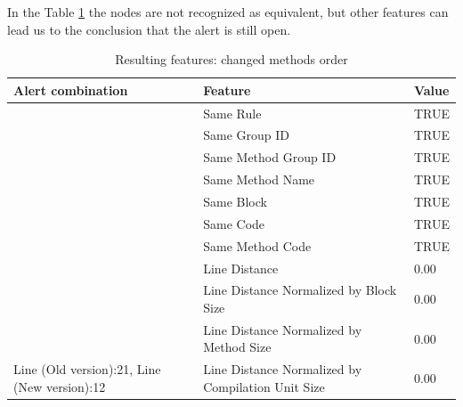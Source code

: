 \documentclass[
]{article}
\begin{document}
\newpage

In the Table \ref{changing_method_order} the nodes are not recognized as
equivalent, but other features can lead us to the conclusion that the
alert is still open.

\small

\begin{table}[!h]

\caption{\label{tab:unnamed-chunk-16}Resulting features: changed methods order \label{changing_method_order} }
\centering
\begin{tabular}[t]{l|l|l}
\hline
Alert combination & Feature & Value\\
\hline
\rowcolor{gray!6}   & Same Rule & TRUE\\

 & Same Group ID & TRUE\\

\rowcolor{gray!6}   & Same Method Group ID & TRUE\\

 & Same Method Name & TRUE\\

\rowcolor{gray!6}   & Same Block & TRUE\\

 & Same Code & TRUE\\

\rowcolor{gray!6}   & Same Method Code & TRUE\\

 & Line Distance & 0.00\\

\rowcolor{gray!6}   & Line Distance Normalized by Block Size & 0.00\\

 & Line Distance Normalized by Method Size & 0.00\\

\multirow[t]{-11}{*}{\raggedright\arraybackslash Line (Old version):21, Line (New version):12} & Line Distance Normalized by Compilation Unit Size & 0.00\\
\hline
\end{tabular}
\end{table}

\normalsize

\newpage
\end{document}
